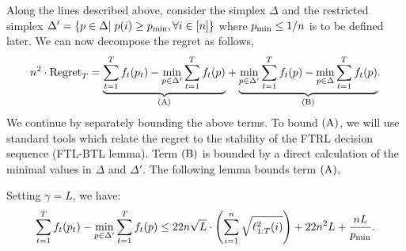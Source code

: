  Along the lines described above,  
consider the simplex $\Delta$ and the restricted simplex \linebreak $\Delta'=\{ p\in \Delta |  \; p(i) \geq p_{\text{min}}, \forall i \in [n] \}$ where  $p_{\text{min}} \leq 1/n$ is to be defined later. We can now decompose the regret  as follows,
\begin{align} \label{eq:regret}
n^2 \cdot \regret_T
=
 \underset{\rA}{\underbrace{ \sumtt f_t(p_t)  - \min_{p \in \Delta'} \sumtt f_t(p)   }} 
 +  
 \underset{\rB}{\underbrace{\min_{p \in \Delta'} \sumtt f_t(p) - \min_{p \in \Delta} \sumtt f_t(p)   }}.
\end{align}
We continue by separately bounding the above terms.
To bound $\rA$, we will use standard tools which relate the regret to the stability of the FTRL decision sequence (FTL-BTL lemma). Term $\rB$ is  bounded by a direct calculation of the minimal values in $\Delta$ and $\Delta'$.
The following lemma bounds term $\rA$.
\begin{lemma} \label{lemma:ub-a} Setting $\gamma =L$, we have:
\begin{equation*}
\sum_{t=1}^T f_t(p_t)   - \min_{p \in \Delta'} \sum_{t=1}^T f_t(p)  \leq 
22n\sqrt{L} \cdot \left( \sum_{i=1}^n \sqrt{ \ell_{1:T}^2(i) } \right) +22n^2L+\frac{nL}{p_{\text{min}}}.
\end{equation*}
\end{lemma}

